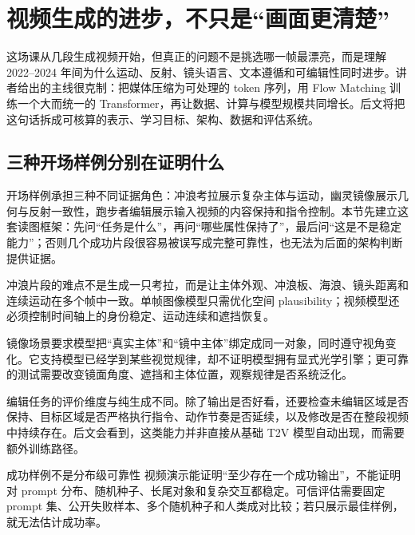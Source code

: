 \section{视频生成的进步，不只是“画面更清楚”}

这场课从几段生成视频开始，但真正的问题不是挑选哪一帧最漂亮，而是理解 2022--2024 年间为什么运动、反射、镜头语言、文本遵循和可编辑性同时进步。讲者给出的主线很克制：把媒体压缩为可处理的 token 序列，用 Flow Matching 训练一个大而统一的 Transformer，再让数据、计算与模型规模共同增长。后文将把这句话拆成可核算的表示、学习目标、架构、数据和评估系统。

\subsection{三种开场样例分别在证明什么}

开场样例承担三种不同证据角色：冲浪考拉展示复杂主体与运动，幽灵镜像展示几何与反射一致性，跑步者编辑展示输入视频的内容保持和指令控制。本节先建立这套读图框架：先问“任务是什么”，再问“哪些属性保持了”，最后问“这是不是稳定能力”；否则几个成功片段很容易被误写成完整可靠性，也无法为后面的架构判断提供证据。


冲浪片段的难点不是生成一只考拉，而是让主体外观、冲浪板、海浪、镜头距离和连续运动在多个帧中一致。单帧图像模型只需优化空间 plausibility；视频模型还必须控制时间轴上的身份稳定、运动连续和遮挡恢复。


镜像场景要求模型把“真实主体”和“镜中主体”绑定成同一对象，同时遵守视角变化。它支持模型已经学到某些视觉规律，却不证明模型拥有显式光学引擎；更可靠的测试需要改变镜面角度、遮挡和主体位置，观察规律是否系统泛化。


编辑任务的评价维度与纯生成不同。除了输出是否好看，还要检查未编辑区域是否保持、目标区域是否严格执行指令、动作节奏是否延续，以及修改是否在整段视频中持续存在。后文会看到，这类能力并非直接从基础 T2V 模型自动出现，而需要额外训练路径。

\begin{warningbox}{成功样例不是分布级可靠性}
视频演示能证明“至少存在一个成功输出”，不能证明对 prompt 分布、随机种子、长尾对象和复杂交互都稳定。可信评估需要固定 prompt 集、公开失败样本、多个随机种子和人类成对比较；若只展示最佳样例，就无法估计成功率。
\end{warningbox}

